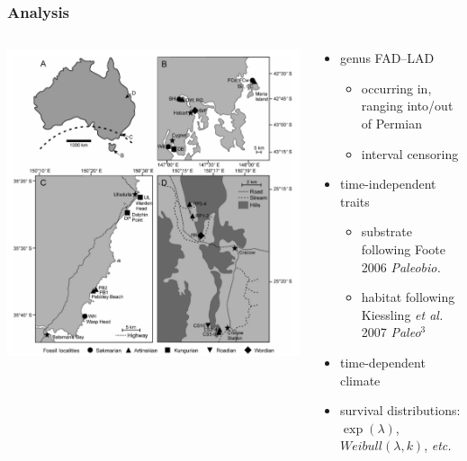 \documentclass{beamer}
\begin{document}
\begin{frame}
  \frametitle{Analysis}

  \begin{columns}
    \begin{column}{0.5\textwidth}
      \begin{center}
        \includegraphics[height = 0.8\textheight, width = \textwidth, keepaspectratio = true]{figure/australia}

        \tiny{}
      \end{center}
    \end{column}
    \begin{column}{0.5\textwidth}
      \begin{itemize}
        \item genus FAD--LAD
          \begin{itemize}
            \item occurring in, ranging into/out of Permian
            \item interval censoring
          \end{itemize}
        \item time-independent traits
          \begin{itemize}
            \item substrate following Foote 2006 \textit{Paleobio.}
            \item habitat following Kiessling \textit{et al.} 2007 \textit{Paleo\(^3\)}
          \end{itemize}
        \item time-dependent climate 
        \item survival distributions: \(\exp(\lambda)\), \(Weibull(\lambda, k)\), \textit{etc.}
      \end{itemize}
    \end{column}
  \end{columns}
\end{frame}
\end{document}
